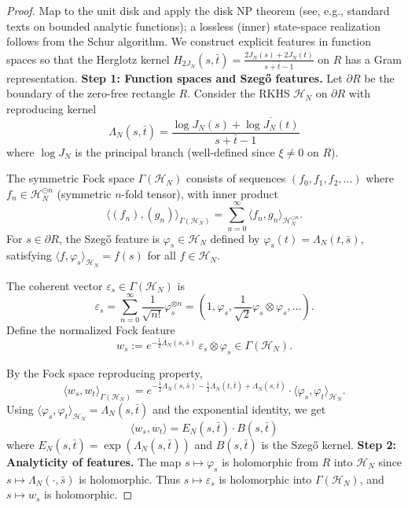 \documentclass[11pt]{article}
\theoremstyle{definition}
\theoremstyle{remark}
\begin{document}
\begin{proof}
Map to the unit disk and apply the disk NP theorem (see, e.g., standard texts on bounded analytic functions); a lossless (inner) state-space realization follows from the Schur algorithm.
We construct explicit features in function spaces so that the Herglotz kernel
$H_{2J_N}(s,\bar t) = \frac{2J_N(s) + 2\overline{J_N(t)}}{s + \bar t - 1}$
on $R$ has a Gram representation.
\medskip
\noindent\textbf{Step 1: Function spaces and Szegő features.}
Let $\partial R$ be the boundary of the zero-free rectangle $R$. Consider the RKHS $\mathcal{H}_N$ on $\partial R$ with reproducing kernel
\[
  \Lambda_N(s,\bar t) = \frac{\log J_N(s) + \overline{\log J_N(t)}}{s + \bar t - 1}
\]
where $\log J_N$ is the principal branch (well-defined since $\xi \neq 0$ on $R$).

The symmetric Fock space $\Gamma(\mathcal{H}_N)$ consists of sequences $(f_0, f_1, f_2, \ldots)$ where $f_n \in \mathcal{H}_N^{\odot n}$ (symmetric $n$-fold tensor), with inner product
\[
  \langle (f_n), (g_n) \rangle_{\Gamma(\mathcal{H}_N)} = \sum_{n=0}^\infty \langle f_n, g_n \rangle_{\mathcal{H}_N^{\odot n}}.
\]
For $s \in \partial R$, the Szegő feature is $\varphi_s \in \mathcal{H}_N$ defined by $\varphi_s(t) = \Lambda_N(t,\bar s)$, satisfying $\langle f, \varphi_s \rangle_{\mathcal{H}_N} = f(s)$ for all $f \in \mathcal{H}_N$.

The coherent vector $\varepsilon_s \in \Gamma(\mathcal{H}_N)$ is
\[
  \varepsilon_s = \sum_{n=0}^\infty \frac{1}{\sqrt{n!}} \varphi_s^{\otimes n} = (1, \varphi_s, \frac{1}{\sqrt{2}} \varphi_s \otimes \varphi_s, \ldots).
\]
Define the normalized Fock feature
\[
  w_s := e^{-\frac{1}{2}\Lambda_N(s,\bar s)} \, \varepsilon_s \otimes \varphi_s \in \Gamma(\mathcal{H}_N).
\]

By the Fock space reproducing property,
\[
  \langle w_s, w_t \rangle_{\Gamma(\mathcal{H}_N)} = e^{-\frac{1}{2}\Lambda_N(s,\bar s) - \frac{1}{2}\Lambda_N(t,\bar t) + \Lambda_N(s,\bar t)} \cdot \langle \varphi_s, \varphi_t \rangle_{\mathcal{H}_N}.
\]
Using $\langle \varphi_s, \varphi_t \rangle_{\mathcal{H}_N} = \Lambda_N(s,\bar t)$ and the exponential identity, we get
\[
  \langle w_s, w_t \rangle = E_N(s,\bar t) \cdot B(s,\bar t)
\]
where $E_N(s,\bar t) = \exp(\Lambda_N(s,\bar t))$ and $B(s,\bar t)$ is the Szegő kernel.
\medskip
\noindent\textbf{Step 2: Analyticity of features.}
The map $s \mapsto \varphi_s$ is holomorphic from $R$ into $\mathcal{H}_N$ since $s \mapsto \Lambda_N(\cdot, \bar s)$ is holomorphic. Thus $s \mapsto \varepsilon_s$ is holomorphic into $\Gamma(\mathcal{H}_N)$, and $s \mapsto w_s$ is holomorphic.


\end{proof}
\end{document}
